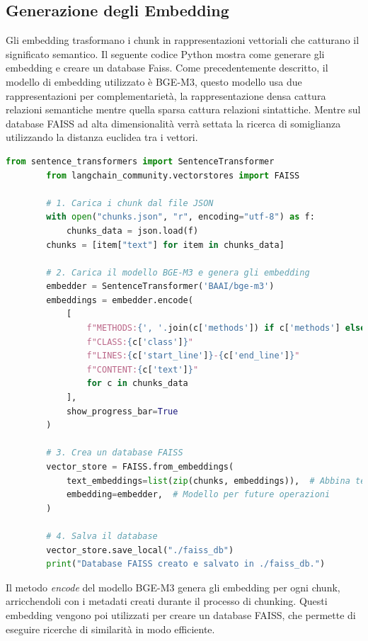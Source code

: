 \documentclass[12pt,a4paper,openright,twoside]{book}
\begin{document}
\subsection{Generazione degli Embedding}
Gli embedding trasformano i chunk in rappresentazioni vettoriali che catturano il significato semantico.
Il seguente codice Python mostra come generare gli embedding e creare un database Faiss.
Come precedentemente descritto, il modello di embedding utilizzato è BGE-M3, questo modello usa due rappresentazioni per complementarietà, la rappresentazione densa cattura relazioni semantiche mentre quella sparsa cattura relazioni sintattiche.
Mentre sul database FAISS ad alta dimensionalità verrà settata la ricerca di somiglianza utilizzando la distanza euclidea tra i vettori.
    \begin{lstlisting}[language=Python, caption={Generazione degli embedding e creazione di un database FAISS}, label={lst:embeddings}]
        from sentence_transformers import SentenceTransformer
        from langchain_community.vectorstores import FAISS
        
        # 1. Carica i chunk dal file JSON
        with open("chunks.json", "r", encoding="utf-8") as f:
            chunks_data = json.load(f)        
        chunks = [item["text"] for item in chunks_data]
        
        # 2. Carica il modello BGE-M3 e genera gli embedding
        embedder = SentenceTransformer('BAAI/bge-m3')
        embeddings = embedder.encode(
            [
                f"METHODS:{', '.join(c['methods']) if c['methods'] else 'unknown'}" 
                f"CLASS:{c['class']}"
                f"LINES:{c['start_line']}-{c['end_line']}"
                f"CONTENT:{c['text']}"
                for c in chunks_data
            ],
            show_progress_bar=True
        )
        
        # 3. Crea un database FAISS
        vector_store = FAISS.from_embeddings(
            text_embeddings=list(zip(chunks, embeddings)),  # Abbina testi e embedding
            embedding=embedder,  # Modello per future operazioni
        )
        
        # 4. Salva il database
        vector_store.save_local("./faiss_db")
        print("Database FAISS creato e salvato in ./faiss_db.")
    \end{lstlisting}
Il metodo \emph{encode} del modello BGE-M3 genera gli embedding per ogni chunk,
arricchendoli con i metadati creati durante il processo di chunking.
Questi embedding vengono poi utilizzati per creare un database FAISS, che permette di eseguire ricerche di similarità in modo efficiente.
\end{document}
